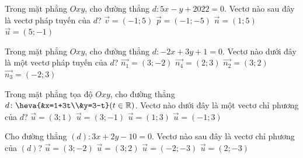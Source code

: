 \begin{ex}%
	Trong mặt phẳng $Oxy$, cho đường thẳng $d\colon 5x-y+2022=0$. Vectơ nào sau đây là vectơ pháp tuyến của $d$?
	\choice
	{$\overrightarrow{v}=\left(-1;5\right)$}
	{$\overrightarrow{p}=\left(-1;-5\right)$}
	{$\overrightarrow{n}=\left(1;5\right)$}
	{\True $\overrightarrow{u}=\left(5;-1\right)$}
\end{ex}


\begin{ex}%
	Trong mặt phẳng $Oxy$, cho đường thẳng $d: -2x+3y+1=0$. Vectơ nào dưới đây là một vectơ pháp tuyến của $d$?
	\choice
	{$\overrightarrow{n_1}=(3;-2)$}
	{$\overrightarrow{n_4}=(2;3)$}
	{$\overrightarrow{n_2}=(3;2)$}
	{\True $\overrightarrow{n_3}=(-2;3)$}
\end{ex}


\begin{ex}%
	Trong mặt phẳng tọa độ $O x y$, cho đường thẳng $d\colon \heva{&x=1+3t\\&y=3-t} (t \in \mathbb{R})$. Vectơ nào dưới đây là một vectơ chỉ phương của $d$?
	\choice
	{$\overrightarrow{u}=(3; 1)$}
	{\True $\overrightarrow{u}=(3;-1)$}
	{$\overrightarrow{u}=(1; 3)$}
	{$\overrightarrow{u}=(-1; 3)$}
	\loigiai{
	}
\end{ex}


\begin{ex}%
	Cho đường thẳng $(d)\colon 3x+2y-10=0$. Vectơ  nào sau đây là vectơ chỉ phương của $(d)$?
	\choice
	{$\overrightarrow{u}=(3;-2) $}
	{$\overrightarrow{u}=(3;2) $}
	{$\overrightarrow{u}=(-2;-3) $}
	{\True $\overrightarrow{u}=(2;-3) $}
\end{ex}


